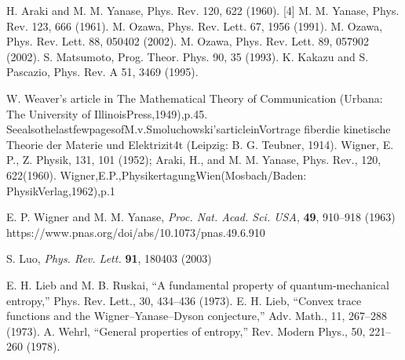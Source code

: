\begin{thebibliography}{}
 H. Araki and M. M. Yanase, Phys. Rev. 120, 622 (1960). [4] M. M. Yanase, Phys. Rev. 123, 666 (1961).
 M. Ozawa, Phys. Rev. Lett. 67, 1956 (1991).
 M. Ozawa, Phys. Rev. Lett. 88, 050402 (2002).
 M. Ozawa, Phys. Rev. Lett. 89, 057902 (2002).
 S. Matsumoto, Prog. Theor. Phys. 90, 35 (1993).
 K. Kakazu and S. Pascazio, Phys. Rev. A 51, 3469
(1995).


 W. Weaver's article in The Mathematical Theory of Communication (Urbana: The University of IllinoisPress,1949),p.45. SeealsothelastfewpagesofM.v.Smoluchowski'sarticleinVortrage fiberdie kinetische Theorie der Materie und Elektrizit4t (Leipzig: B. G. Teubner, 1914).
 Wigner, E. P., Z. Physik, 131, 101 (1952); Araki, H., and M. M. Yanase, Phys. Rev., 120, 622(1960).
 Wigner,E.P.,PhysikertagungWien(Mosbach/Baden: PhysikVerlag,1962),p.1

 E. P. Wigner and M. M. Yanase, \textit{Proc. Nat. Acad. Sci. USA}, \textbf{49}, 910–918 (1963) https://www.pnas.org/doi/abs/10.1073/pnas.49.6.910

 S. Luo, \textit{Phys. Rev. Lett.} \textbf{91}, 180403 (2003)

 E. H. Lieb and M. B. Ruskai, “A fundamental property of quantum-mechanical entropy,” Phys. Rev. Lett., 30, 434–436 (1973).
 E. H. Lieb, “Convex trace functions and the Wigner–Yanase–Dyson conjecture,” Adv. Math., 11, 267–288 (1973).
 A. Wehrl, “General properties of entropy,” Rev. Modern Phys., 50, 221–260 (1978).


\end{thebibliography}
